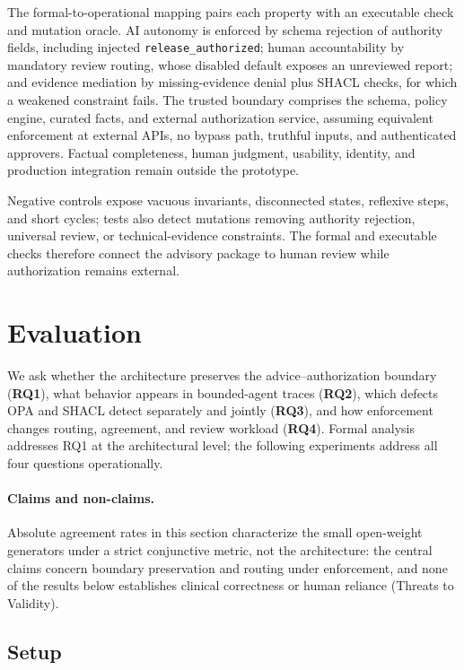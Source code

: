 \documentclass[journal,twoside,web]{ieeecolor}
\begin{document}
The formal-to-operational mapping pairs each property with an executable check and mutation oracle. AI autonomy is enforced by schema rejection of authority fields, including injected \texttt{release\_authorized}; human accountability by mandatory review routing, whose disabled default exposes an unreviewed report; and evidence mediation by missing-evidence denial plus SHACL checks, for which a weakened constraint fails. The trusted boundary comprises the schema, policy engine, curated facts, and external authorization service, assuming equivalent enforcement at external APIs, no bypass path, truthful inputs, and authenticated approvers. Factual completeness, human judgment, usability, identity, and production integration remain outside the prototype.

Negative controls expose vacuous invariants, disconnected states, reflexive steps, and short cycles; tests also detect mutations removing authority rejection, universal review, or technical-evidence constraints. The formal and executable checks therefore connect the advisory package to human review while authorization remains external.

\section{Evaluation}
\label{sec:agent-evaluation}

We ask whether the architecture preserves the advice--authorization boundary (\textbf{RQ1}), what behavior appears in bounded-agent traces (\textbf{RQ2}), which defects OPA and SHACL detect separately and jointly (\textbf{RQ3}), and how enforcement changes routing, agreement, and review workload (\textbf{RQ4}). Formal analysis addresses RQ1 at the architectural level; the following experiments address all four questions operationally.

\paragraph{Claims and non-claims.} Absolute agreement rates in this section characterize the small open-weight generators under a strict conjunctive metric, not the architecture: the central claims concern boundary preservation and routing under enforcement, and none of the results below establishes clinical correctness or human reliance (Threats to Validity).

\subsection{Setup}
\label{sec:eval-setup}
\end{document}
